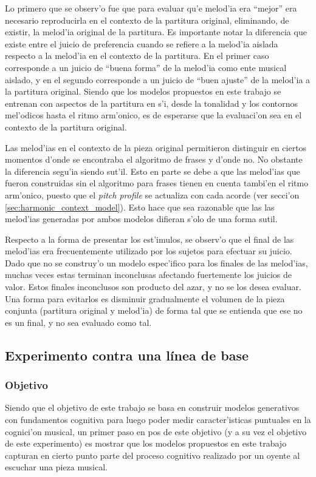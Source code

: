 Lo primero que se observ'o fue que para evaluar qu'e melod'ia era ``mejor'' era necesario reproducirla en el contexto de la partitura original, eliminando, de existir, la melod'ia original de la partitura. Es importante notar la diferencia que existe entre el juicio de preferencia cuando se refiere
a la melod'ia aislada respecto a la melod'ia en el contexto de la partitura. En el primer caso corresponde a un juicio de ``buena forma'' de la 
melod'ia como ente musical aislado, y en el segundo corresponde a un juicio de ``buen ajuste'' de la melod'ia a la partitura original. Siendo que 
los modelos propuestos en este trabajo se entrenan con aspectos de la partitura en s'i, desde la tonalidad y los contornos mel'odicos hasta el ritmo
arm'onico, es de esperarse que la evaluaci'on sea en el contexto de la partitura original.

Las melod'ias en el contexto de la pieza original permitieron distinguir en ciertos momentos d'onde se encontraba el algoritmo de frases y d'onde no.
No obstante la diferencia segu'ia siendo sut'il. Esto en parte se debe a que las melod'ias que fueron construidas sin el algoritmo para frases
tienen en cuenta tambi'en el ritmo arm'onico, puesto que el \emph{pitch profile} se actualiza con cada acorde (ver secci'on \ref{sec:harmonic_context_model}).
Esto hace que sea razonable que las las melod'ias generadas por ambos modelos difieran s'olo de una forma sutil.

Respecto a la forma de presentar los est'imulos, se observ'o que el final de las melod'ias era frecuentemente utilizado por los sujetos para
efectuar su juicio. Dado que no se construy'o un modelo espec'ifico para los finales de las melod'ias, muchas veces estas terminan inconclusas afectando fuertemente los juicios de valor.
Estos finales inconclusos son producto del azar, y no se los desea evaluar. Una forma para evitarlos es disminuir gradualmente el volumen de la pieza conjunta
(partitura original y melod'ia) de forma tal que se entienda que ese no es un final, y no sea evaluado como tal.


\subsection{Experimento contra una l\'inea de base}
\label{sec:exp_baseline}
\subsubsection{Objetivo}
Siendo que el objetivo de este trabajo se basa en construir modelos generativos con fundamentos cognitiva para luego poder medir caracter'isticas puntuales
en la cognici'on musical, un primer paso en pos de este objetivo (y a su vez el objetivo de este experimento) es mostrar que los modelos propuestos 
en este trabajo capturan en cierto punto parte del proceso cognitivo realizado por un oyente al escuchar una pieza musical. 

